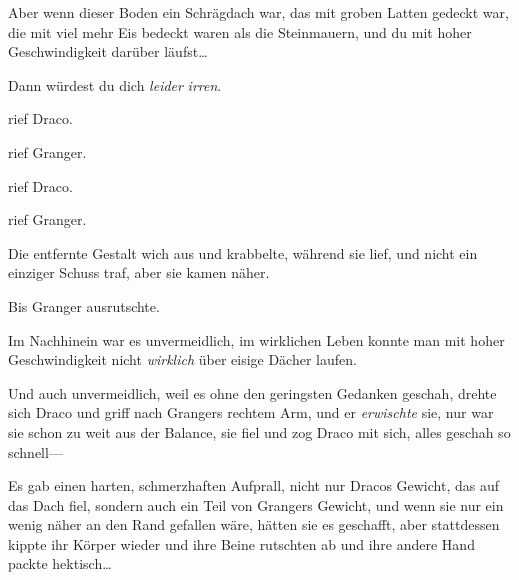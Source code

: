Aber wenn dieser Boden ein Schrägdach war, das mit groben Latten gedeckt war, die mit viel mehr Eis bedeckt waren als die Steinmauern, und du mit hoher Geschwindigkeit darüber läufst…

Dann würdest du dich \emph{leider} \emph{irren}.

 rief Draco.

 rief Granger.

 rief Draco.

 rief Granger.

Die entfernte Gestalt wich aus und krabbelte, während sie lief, und nicht ein einziger Schuss traf, aber sie kamen näher.

Bis Granger ausrutschte.

Im Nachhinein war es unvermeidlich, im wirklichen Leben konnte man mit hoher Geschwindigkeit nicht \emph{wirklich} über eisige Dächer laufen.

Und auch unvermeidlich, weil es ohne den geringsten Gedanken geschah, drehte sich Draco und griff nach Grangers rechtem Arm, und er \emph{erwischte} sie, nur war sie schon zu weit aus der Balance, sie fiel und zog Draco mit sich, alles geschah so schnell—

Es gab einen harten, schmerzhaften Aufprall, nicht nur Dracos Gewicht, das auf das Dach fiel, sondern auch ein Teil von Grangers Gewicht, und wenn sie nur ein wenig näher an den Rand gefallen wäre, hätten sie es geschafft, aber stattdessen kippte ihr Körper wieder und ihre Beine rutschten ab und ihre andere Hand packte hektisch…

